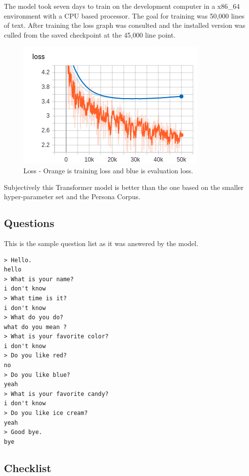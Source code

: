 The model took seven days to train on the development computer in a x86\_64 environment with a CPU based processor. 
The goal for training was 50,000 lines of text. After training the loss graph was consulted and the installed version was culled from the saved checkpoint at the 45,000 line point.


\begin{figure}[H]
	\begin{center}
		\includegraphics[scale=3.5]{Figure_2}
		
		
	\end{center}
	\caption[Loss - Larger Transformer Model]{Loss - Orange is training loss and blue is evaluation loss.}
	
\end{figure}

Subjectively this Transformer model is better than the one based on the smaller hyper-parameter set and the Persona Corpus.


\subsection{Questions}
This is the sample question list as it was answered by the model.

\begin{verbatim}
> Hello.
hello 
> What is your name?
i don't know 
> What time is it?
i don't know 
> What do you do?
what do you mean ?
> What is your favorite color?
i don't know 
> Do you like red?
no 
> Do you like blue?
yeah 
> What is your favorite candy?
i don't know 
> Do you like ice cream?
yeah 
> Good bye.
bye 
\end{verbatim}

\subsection{Checklist}

